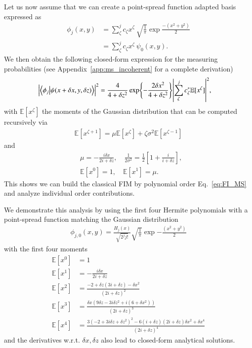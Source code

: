 \documentclass[reprint,amsmath,amssymb,aps,pra,floatfix]{revtex4-2}
\begin{document}
Let us now assume that we can create a point-spread function adapted basis \cite{rehacek2017optimal} expressed as
\begin{align}
    \phi_j(x,y) &=\sum_\zeta^j c_\zeta x^\zeta \ \sqrt{\frac{1}{\pi}} \exp{\frac{-(x^2 + y^2)}{2}}\\
    &= \sum_\zeta^j c_\zeta x^\zeta \ \psi_0(x,y) \nonumber .
\end{align}
We then obtain the following closed-form expression for the measuring probabilities (see Appendix~\ref{app:ms_incoherent} for a complete derivation)
\begin{align}
    \abs{\braket{\phi_j}{\psi(x+\delta x,y,\delta z)}}^2 &= \frac{4}{4 + \delta z^2}\exp{-\frac{2\delta x^2}{4+\delta z^2}}\abs{\sum_\zeta^j c^*_\zeta \mathbb{E}[x^\zeta]}^2,
    \label{eq:three_sources_incoherent_ms_prob}
\end{align}
with $\mathbb{E}[x^\zeta]$ the moments of the Gaussian distribution that can be computed recursively via
\begin{align}
\label{def:recursive_moments}
    \mathbb{E}[x^{\zeta+1}] = \mu \mathbb{E}[x^\zeta] + \zeta \sigma^2 \mathbb{E}[x^{\zeta-1}]
\end{align}
and
\begin{align}
\label{def:mu_sigma}
&\mu = - \frac{i\delta x}{2i + \delta z}, \quad \frac{1}{2\sigma^2} = \frac{1}{2} \left[ 1 + \frac{i}{i + \delta z} \right], \\
&\mathbb{E}[x^0] = 1, \quad \mathbb{E}[x^1] = \mu.  \nonumber
\end{align}
This shows we can build the classical FIM by polynomial order Eq.~\eqref{eq:FI_MS} and analyze individual order contributions.

We demonstrate this analysis by using the first four Hermite polynomials \cite{weisstein2002hermite} with a point-spread function matching the Gaussian distribution
\begin{align}
    \phi_{j,0}(x,y) = \frac{H_j(x)}{\sqrt{2^j j!}} \sqrt{\frac{1}{\pi}} \exp{-\frac{(x^2 + y^2)}{2}}
\end{align}
with the first four moments
\begin{align}
    \mathbb{E}[x^0] &= 1 \\
    \mathbb{E}[x^1] &= -\frac{i \delta x}{2i + \delta z} \\
    \mathbb{E}[x^2] &= \frac{-2 + \delta z (3i + \delta z) - \delta x^2}{(2i + \delta z)^2} \\
    \mathbb{E}[x^3] &= \frac{\delta x (9 \delta z - 3i \delta z^2 + i (6 + \delta x^2))}{(2 i + \delta z)^3} \\
    \mathbb{E}[x^4] &= \frac{3 (-2 + 3 i \delta z + \delta z^2)^2 - 6 (i + \delta z) (2 i + \delta z) \delta x^2 + \delta x^4}{(2 i + \delta z)^4}
\end{align}
and the derivatives w.r.t. $\delta x,\delta z$ also lead to closed-form analytical solutions.
\end{document}
